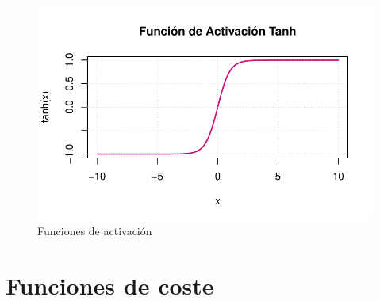\documentclass[
  us-letterpaper,
]{scrreprt}
\theoremstyle{definition}
\theoremstyle{plain}
\theoremstyle{plain}
\theoremstyle{definition}
\theoremstyle{remark}
\begin{document}
\begin{figure}
\begin{minipage}{0.33\linewidth}
{\includegraphics{redes_files/figure-pdf/fig-fact-5.pdf}

}


\end{minipage}%
%
\begin{minipage}{0.33\linewidth}



\end{minipage}%

\caption{\label{fig-fact}Funciones de activación}

\end{figure}%

\section{Funciones de coste}\label{funciones-de-coste}
\end{document}

